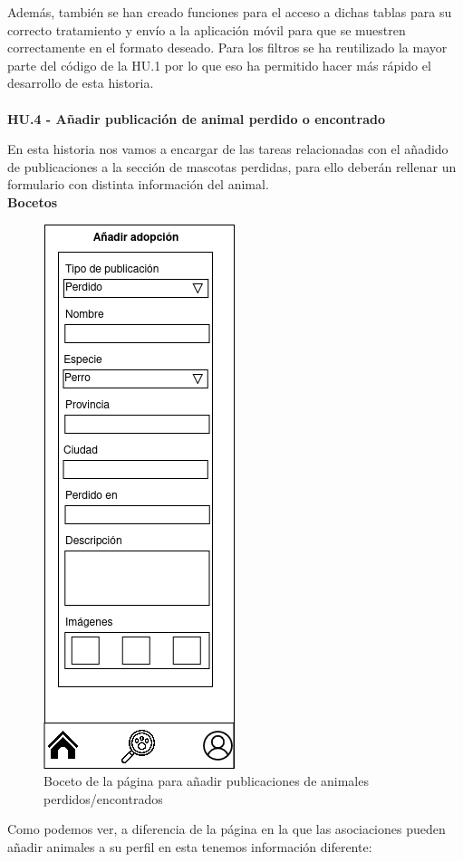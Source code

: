 Además, también se han creado funciones para el acceso a dichas tablas para su correcto tratamiento y envío a la aplicación móvil para que se muestren correctamente en el formato deseado. Para los filtros se ha reutilizado la mayor parte del código de la HU.1 por lo que eso ha permitido hacer más rápido el desarrollo de esta historia.\\ \\

\Large{\textbf{HU.4 - Añadir publicación de animal perdido o encontrado}}

En esta historia nos vamos a encargar de las tareas relacionadas con el añadido de publicaciones a la sección de mascotas perdidas, para ello deberán rellenar un formulario con distinta información del animal. \\
\textbf{Bocetos}
\begin{figure}[H]
	\centering
	\includegraphics[width=0.31\linewidth]{"sprint 2/hu4/postearPerdido"}
	\caption{Boceto de la página para añadir publicaciones de animales perdidos/encontrados}
	\label{fig:postearperdido}
\end{figure}

Como podemos ver, a diferencia de la página en la que las asociaciones pueden añadir animales a su perfil en esta tenemos información diferente:

